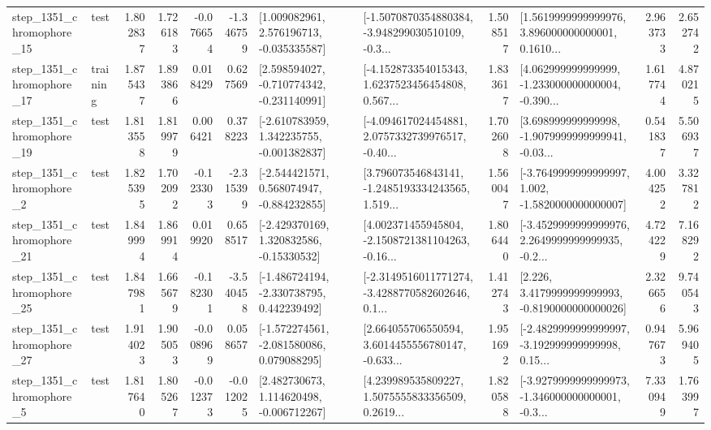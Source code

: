 \begin{tabular}{llrrrrllrlrr}
 step\_1351\_chromophore\_15 &      test &      1.802837 &    1.726183 &     -0.076654 & -1.346759 &    [1.009082961, 2.576196713, -0.035335587] &  [-1.5070870354880384, -3.948299030510109, -0.3... &       1.508517 &  [1.5619999999999976, 3.896000000000001, 0.1610... &            2.963733 &          2.652742 \\
 step\_1351\_chromophore\_17 &  training &      1.875437 &    1.893866 &      0.018429 &  0.627569 &   [2.598594027, -0.710774342, -0.231140991] &  [-4.152873354015343, 1.6237523456454808, 0.567... &       1.833617 &  [4.062999999999999, -1.233000000000004, -0.390... &            1.617744 &          4.870215 \\
 step\_1351\_chromophore\_19 &      test &      1.813558 &    1.819979 &      0.006421 &  0.378223 &   [-2.610783959, 1.342235755, -0.001382837] &  [-4.094617024454881, 2.0757332739976517, -0.40... &       1.702608 &  [3.698999999999998, -1.9079999999999941, -0.03... &            0.541837 &          5.506937 \\
  step\_1351\_chromophore\_2 &      test &      1.825395 &    1.702092 &     -0.123303 & -2.315399 &   [-2.544421571, 0.568074947, -0.884232855] &  [3.796073546843141, -1.2485193334243565, 1.519... &       1.560047 &  [-3.7649999999999997, 1.002, -1.5820000000000007] &            4.004252 &          3.327812 \\
 step\_1351\_chromophore\_21 &      test &      1.849994 &    1.869914 &      0.019920 &  0.658517 &    [-2.429370169, 1.320832586, -0.15330532] &  [4.002371455945804, -2.1508721381104263, -0.16... &       1.806440 &  [-3.4529999999999976, 2.2649999999999935, -0.2... &            4.724229 &          7.168292 \\
 step\_1351\_chromophore\_25 &      test &      1.847981 &    1.665679 &     -0.182301 & -3.540458 &   [-1.486724194, -2.330738795, 0.442239492] &  [-2.3149516011771274, -3.4288770582602646, 0.1... &       1.412743 &   [2.226, 3.4179999999999993, -0.8190000000000026] &            2.326656 &          9.740543 \\
 step\_1351\_chromophore\_27 &      test &      1.914023 &    1.905053 &     -0.008969 &  0.058657 &   [-1.572274561, -2.081580086, 0.079088295] &  [2.664055706550594, 3.6014455556780147, -0.633... &       1.951692 &  [-2.4829999999999997, -3.192999999999998, 0.15... &            0.947673 &          5.969405 \\
  step\_1351\_chromophore\_5 &      test &      1.817640 &    1.805267 &     -0.012373 & -0.012025 &    [2.482730673, 1.114620498, -0.006712267] &  [4.239989535809227, 1.5075555833356509, 0.2619... &       1.820588 &  [-3.9279999999999973, -1.346000000000001, -0.3... &            7.330949 &          1.763997 \\

\end{tabular}
